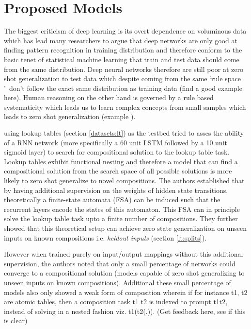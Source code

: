 \chapter{Proposed Models}\label{Chapter:proposals}

The biggest criticism of deep learning is its overt dependence on voluminous data which has lead many researchers to argue that deep networks are only good at finding pattern recognition in training distribution and therefore conform to the basic tenet of statistical machine learning that train and test data should come from the same distribution. Deep neural networks therefore are still poor at zero shot generalization to test data which despite coming from the same \lq rule space {}\rq\ don't follow the exact same distribution as training data (find a good example here). Human reasoning on the other hand is governed by a rule based systematicity which leads us to learn complex concepts from small samples which leads to zero shot generalization (example ).

\cite{Liska2018} using lookup tables (section \ref{datasets:lt}) as the testbed tried to asses the ability of a RNN network (more specifically a 60 unit LSTM followed by a 10 unit sigmoid layer) to search for compositional solution to the lookup table task. Lookup tables exhibit functional nesting and therefore a model that can find a compositional solution from the search space of all possible solutions is more likely to zero shot generalize to novel compositions. The authors established that by having additional supervision on the weights of hidden state transitions, theoretically a finite-state automata (FSA) can be induced such that the recurrent layers encode the states of this automaton. This FSA can in principle solve the lookup table task upto a finite number of compositions. They further showed that this theoretical setup can achieve zero state generalization on unseen inputs on known compositions i.e. \textit{heldout inputs} (section \ref{lt:splits}).

However when trained purely on input/output mappings without this additional supervision, the authors noted that only a small percentage of networks could converge to a compositional solution (models capable of zero shot generalizing to unseen inputs on known compositions). Additional these small percentage of models also only showed a weak form of composition wherein if for instance t1, t2 are atomic tables, then a composition task t1 t2 is indexed to prompt t1t2, instead of solving in a nested fashion viz. t1(t2(.)). (Get feedback here, see if this is clear)

